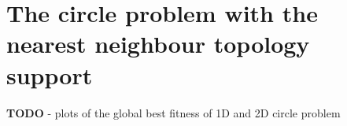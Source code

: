 \section{The circle problem with the nearest neighbour topology support}

\textbf{TODO} - plots of the global best fitness of 1D and 2D circle problem
